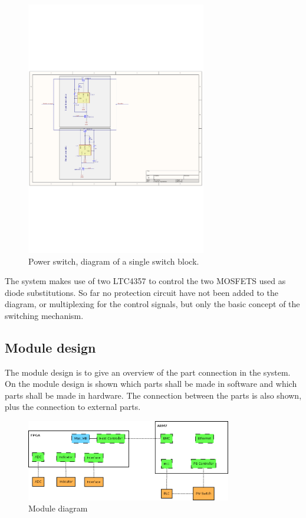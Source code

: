 \begin{figure}[H]
	\begin{centering}
		\includegraphics[width=0.7\textwidth,page=1,angle=0]{images/PS_initial_drawing.pdf}
		\caption{Power switch, diagram of a single switch block.}
		\label{fig:ps_switch_dia_v0_1}
	\end{centering}
\end{figure}
The system makes use of two LTC4357 to control the two MOSFETS used as diode substitutions. So far no protection circuit have not been added to the diagram, or multiplexing for the control signals, but only the basic concept of the switching mechanism.

\subsection{Module design}

The module design is to give an overview of the part connection in the system. On the module design is shown which parts shall be made in software and which parts shall be made in hardware. The connection between the parts is also shown, plus the connection to external parts.

\begin{figure}[H]
	\begin{centering}
		\includegraphics[width=0.8\textwidth,page=1,angle=0]{images/module_design.png}
		\caption{Module diagram}
		\label{fig:module_design_diagram}
	\end{centering}
\end{figure}


